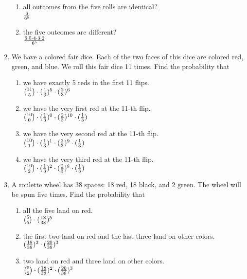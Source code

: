 \documentclass[12pt]{article}%
\newcommand{\0}{{\bf 0}}
\begin{document}
\begin{enumerate}
\begin{enumerate}
\item all outcomes from the five rolls are identical?
\\
{\color{blue}{\bf Sol.}}
$\frac{6}{6^5}$
\item the five outcomes are different?
\\
{\color{blue}{\bf Sol.}}
$\frac{6\cdot5\cdot4\cdot3\cdot2}{6^5}$
\end{enumerate}




\item 
We have a colored fair dice. 
Each of the two faces of this dice are colored red, green, and blue.
We roll this fair dice 11 times. 
Find the probability that
\begin{enumerate}
\item we have exactly 5 reds in the first 11 flips.
\\
{\color{blue}{\bf Sol.}}
${11\choose 5}\cdot(\frac{1}{3})^5\cdot(\frac{2}{3})^6$
\item we have the very first red at the 11-th flip.
\\
{\color{blue}{\bf Sol.}}
${10\choose 0}\cdot(\frac{1}{3})^0\cdot(\frac{2}{3})^{10}\cdot(\frac{1}{3})$
\item we have the very second red at the 11-th flip.
\\
{\color{blue}{\bf Sol.}}
${10\choose 1}\cdot(\frac{1}{3})^1\cdot(\frac{2}{3})^{9}\cdot(\frac{1}{3})$
\item we have the very third red at the 11-th flip.
\\
{\color{blue}{\bf Sol.}}
${10\choose 2}\cdot(\frac{1}{3})^2\cdot(\frac{2}{3})^{8}\cdot(\frac{1}{3})$
\end{enumerate}





\item
A roulette wheel has 38 spaces: 18 red, 18 black, and 2 green. 
The wheel will be spun five times.
Find the probability that
\begin{enumerate}
\item all the five land on red.
\\
{\color{blue}{\bf Sol.}}
${5\choose 5}\cdot(\frac{18}{38})^5$
\item the first two land on red and the last three land on other colors.
\\
{\color{blue}{\bf Sol.}}
$(\frac{18}{38})^2\cdot(\frac{20}{38})^3$
\item two land on red and three land on other colors.
\\
{\color{blue}{\bf Sol.}}
${5\choose 2}\cdot(\frac{18}{38})^2\cdot(\frac{20}{38})^3$
\end{enumerate}






\end{enumerate}
\end{document}
